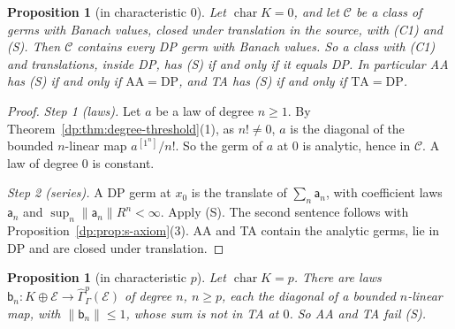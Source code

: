 \documentclass[11pt]{amsart}
\newtheorem{proposition}[theorem]{Proposition}
\theoremstyle{definition}
\theoremstyle{remark}
\numberwithin{equation}{section}
\newcommand{\norm}[1]{\lVert #1\rVert}
\newcommand{\cC}{\mathcal{C}}
\theoremstyle{plain}
\theoremstyle{definition}
\theoremstyle{plain}
\newcommand{\hGamma}{\widehat\Gamma}
\begin{document}
\begin{proposition}[in characteristic $0$]\label{dp:prop:s-char0}
Let $\operatorname{char}K=0$, and let $\cC$ be a class of germs with Banach values, closed under translation in the source, with \textup{(C1)} and \textup{(S)}. Then $\cC$ contains every DP germ with Banach values. So a class with \textup{(C1)} and translations, inside DP, has \textup{(S)} if and only if it equals DP. In particular AA has \textup{(S)} if and only if $\mathrm{AA}=\mathrm{DP}$, and TA has \textup{(S)} if and only if $\mathrm{TA}=\mathrm{DP}$.
\end{proposition}

\begin{proof}
\emph{Step 1 (laws).} Let $a$ be a law of degree $n\ge1$. By Theorem~\ref{dp:thm:degree-threshold}(1), as $n!\ne0$, $a$ is the diagonal of the bounded $n$\nobreakdash-linear map $a^{[1^n]}/n!$. So the germ of $a$ at $0$ is analytic, hence in $\cC$. A law of degree $0$ is constant.

\emph{Step 2 (series).} A DP germ at $x_0$ is the translate of $\sum_n\mathsf a_n$, with coefficient laws $\mathsf a_n$ and $\sup_n\norm{\mathsf a_n}R^n<\infty$. Apply (S). The second sentence follows with Proposition~\ref{dp:prop:s-axiom}(3). AA and TA contain the analytic germs, lie in DP and are closed under translation.
\end{proof}

\begin{proposition}[in characteristic $p$]\label{dp:prop:s-fails}
Let $\operatorname{char}K=p$. There are laws $\mathsf b_n\colon K\oplus\mathcal E\to\hGamma^p_\Gamma(\mathcal E)$ of degree $n$, $n\ge p$, each the diagonal of a bounded $n$\nobreakdash-linear map, with $\norm{\mathsf b_n}\le1$, whose sum is not in TA at $0$. So AA and TA fail \textup{(S)}.
\end{proposition}
\end{document}
